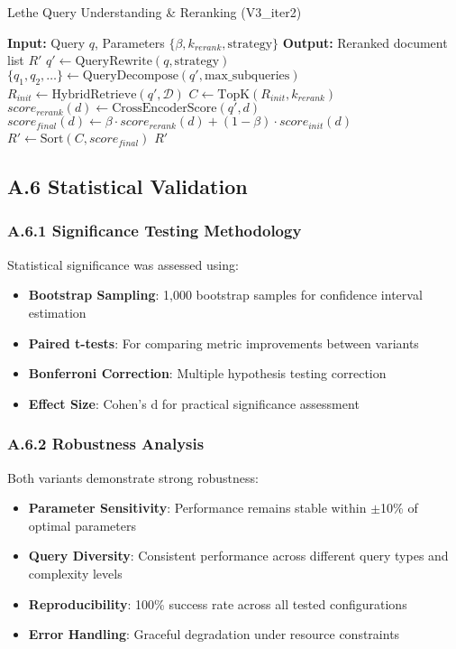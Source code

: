 \documentclass{article}
\begin{document}
\begin{algorithm}
\caption{Lethe Query Understanding \& Reranking (V3\_iter2)}
\begin{algorithmic}[1]
\STATE \textbf{Input:} Query $q$, Parameters $\{\beta, k_{rerank}, \text{strategy}\}$
\STATE \textbf{Output:} Reranked document list $R'$
\STATE $q' \leftarrow \text{QueryRewrite}(q, \text{strategy})$ 
\STATE $\{q_1, q_2, \ldots\} \leftarrow \text{QueryDecompose}(q', \text{max\_subqueries})$
\STATE $R_{init} \leftarrow \text{HybridRetrieve}(q', \mathcal{D})$ 
\STATE $C \leftarrow \text{TopK}(R_{init}, k_{rerank})$ 
    \STATE $score_{rerank}(d) \leftarrow \text{CrossEncoderScore}(q', d)$
    \STATE $score_{final}(d) \leftarrow \beta \cdot score_{rerank}(d) + (1-\beta) \cdot score_{init}(d)$
\ENDFOR
\STATE $R' \leftarrow \text{Sort}(C, score_{final})$
\RETURN $R'$
\end{algorithmic}
\end{algorithm}

\subsection{A.6 Statistical Validation}

\subsubsection{A.6.1 Significance Testing Methodology}
Statistical significance was assessed using:
\begin{itemize}
\item \textbf{Bootstrap Sampling}: 1,000 bootstrap samples for confidence interval estimation
\item \textbf{Paired t-tests}: For comparing metric improvements between variants
\item \textbf{Bonferroni Correction}: Multiple hypothesis testing correction
\item \textbf{Effect Size}: Cohen's d for practical significance assessment
\end{itemize}

\subsubsection{A.6.2 Robustness Analysis}
Both variants demonstrate strong robustness:
\begin{itemize}
\item \textbf{Parameter Sensitivity}: Performance remains stable within $\pm$10\% of optimal parameters
\item \textbf{Query Diversity}: Consistent performance across different query types and complexity levels
\item \textbf{Reproducibility}: 100\% success rate across all tested configurations
\item \textbf{Error Handling}: Graceful degradation under resource constraints
\end{itemize}
\end{document}
